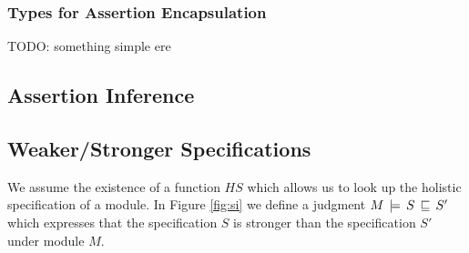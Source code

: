 \subsubsection{Types for Assertion Encapsulation}
\label{types}
TODO: something simple ere 

\subsection{Assertion Inference}




\subsection{Weaker/Stronger Specifications}

We assume   the existence of a function $HS$ which allows us to look up the holistic specification of a module. 
In Figure \ref{fig:si} we   define a judgment $M\, \models\, S\, \sqsubseteq\, S'$ which expresses that the specification $S$ is stronger than the specification $S'$ under module $M$.  

